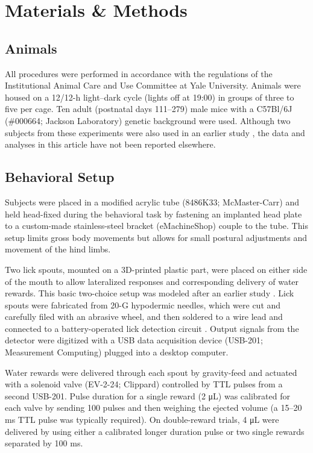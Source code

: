 \section{Materials \& Methods}

\subsection*{Animals}
All procedures were performed in accordance with the regulations of the Institutional Animal Care and Use Committee at Yale University. Animals were housed on a 12/12-h light–dark cycle (lights off at 19:00) in groups of three to five per cage. Ten adult (postnatal days 111–279) male mice with a C57Bl/6J (\#000664; Jackson Laboratory) genetic background were used. Although two subjects from these experiments were also used in an earlier study \citep{siniscalchi2016fast}, the data and analyses in this article have not been reported elsewhere.

\subsection*{Behavioral Setup}
Subjects were placed in a modified acrylic tube (8486K33; McMaster-Carr) and held head-fixed during the behavioral task by fastening an implanted head plate to a custom-made stainless-steel bracket (eMachineShop) couple to the tube. This setup limits gross body movements but allows for small postural adjustments and movement of the hind limbs. 

Two lick spouts, mounted on a 3D-printed plastic part, were placed on either side of the mouth to allow lateralized responses and corresponding delivery of water rewards. This basic two-choice setup was modeled after an earlier study \citep{guo2014flow}. Lick spouts were fabricated from 20-G hypodermic needles, which were cut and carefully filed with an abrasive wheel, and then soldered to a wire lead and connected to a battery-operated lick detection circuit \citep{slotnick2009simple}. Output signals from the detector were digitized with a USB data acquisition device (USB-201; Measurement Computing) plugged into a desktop computer. 

Water rewards were delivered through each spout by gravity-feed and actuated with a solenoid valve (EV-2-24; Clippard) controlled by TTL pulses from a second USB-201. Pulse duration for a single reward (2 \unit{\micro\liter}) was calibrated for each valve by sending 100 pulses and then weighing the ejected volume (a 15–20 ms TTL pulse was typically required). On double-reward trials, 4 \unit{\micro\liter} were delivered by using either a calibrated longer duration pulse or two single rewards separated by 100 ms. 

